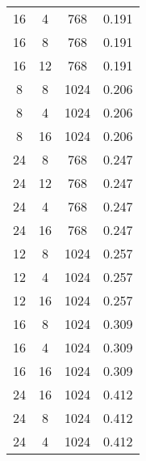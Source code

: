 \begin{table}[tp]
\begin{tabular}{cccc}
16 & 4 & 768 & 0.191\\
16 & 8 & 768 & 0.191\\
16 & 12 & 768 & 0.191\\
8 & 8 & 1024 & 0.206\\
8 & 4 & 1024 & 0.206\\
8 & 16 & 1024 & 0.206\\
24 & 8 & 768 & 0.247\\
24 & 12 & 768 & 0.247\\
24 & 4 & 768 & 0.247\\
24 & 16 & 768 & 0.247\\
12 & 8 & 1024 & 0.257\\
12 & 4 & 1024 & 0.257\\
12 & 16 & 1024 & 0.257\\
16 & 8 & 1024 & 0.309\\
16 & 4 & 1024 & 0.309\\
16 & 16 & 1024 & 0.309\\
24 & 16 & 1024 & 0.412\\
24 & 8 & 1024 & 0.412\\
24 & 4 & 1024 & 0.412\\
\bottomrule
\end{tabular}
\label{tab:grid_full}
\end{table}